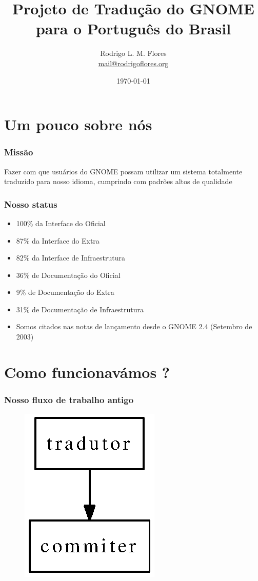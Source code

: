 \documentclass{beamer}
\title{Projeto de Tradução do GNOME para o Português do Brasil}
\author{Rodrigo L. M. Flores \\ \url{mail@rodrigoflores.org}}
\institute{GNOME Brasil}
\begin{document}
\date{\today}

\frame{\titlepage}

\section{Um pouco sobre nós}

\begin{frame}
    \frametitle{Missão}
    Fazer com que usuários do GNOME possam utilizar um sistema 
    totalmente traduzido para nosso idioma, cumprindo com padrões altos de qualidade 
\end{frame}

\begin{frame}
    \frametitle[Para o GNOME 2.28]{Nosso status}    
    \begin{itemize}[<+->]
        \item 100\% da Interface do Oficial 
        \item 87\% da Interface do Extra
        \item 82\% da Interface de Infraestrutura
        \item 36\% de Documentação do Oficial
        \item 9\%  de Documentação do Extra
        \item 31\% de Documentação de Infraestrutura
        \item Somos citados nas notas de lançamento desde o GNOME 2.4 (Setembro de 2003)  
    \end{itemize}

\end{frame}

\section{Como funcionavámos ?}

\begin{frame}
    \frametitle{Nosso fluxo de trabalho antigo}
    \begin{figure}[ht]
        \includegraphics{fluxo_antigo.eps}     
    \end{figure}
\end{frame}
\end{document}
